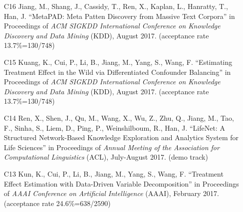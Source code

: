 \documentclass[10pt]{article}
\newenvironment{myindentpar}[1]%
{\begin{list}{}%
         {\setlength{\leftmargin}{#1}}%
         \item[]%
}
{\end{list}}
\newcounter{list}
\begin{document}
\begin{myindentpar}{0.00cm}
\begin{enumerate}[leftmargin=.5cm]
\item[C16] Jiang, M., Shang, J., Cassidy, T., Ren, X., Kaplan, L., Hanratty, T., Han, J. ``MetaPAD: Meta Patten Discovery from Massive Text Corpora'' in Proceedings of \emph{ACM SIGKDD International Conference on Knowledge Discovery and Data Mining} (KDD), August 2017. (acceptance rate 13.7\%=130/748)

\vspace{-0.1cm}

\item[C15] Kuang, K., Cui, P., Li, B., Jiang, M., Yang, S., Wang, F. ``Estimating Treatment Effect in the Wild via Differentiated Confounder Balancing'' in Proceedings of \emph{ACM SIGKDD International Conference on Knowledge Discovery and Data Mining} (KDD), August 2017. (acceptance rate 13.7\%=130/748)

\vspace{-0.1cm}

\item[C14] Ren, X., Shen, J., Qu, M., Wang, X., Wu, Z., Zhu, Q., Jiang, M., Tao, F., Sinha, S., Liem, D., Ping, P., Weinshilboum, R., Han, J. ``LifeNet: A Structured Network-Based Knowledge Exploration and Analytics System for Life Sciences'' in Proceedings of \emph{Annual Meeting of the Association for Computational Linguistics} (ACL), July-August 2017. (demo track)

\vspace{-0.1cm}

\item[C13] Kun, K., Cui, P., Li, B., Jiang, M., Yang, S., Wang, F. ``Treatment Effect Estimation with Data-Driven Variable Decomposition'' in Proceedings of \emph{AAAI Conference on Artificial Intelligence} (AAAI), February 2017. (acceptance rate 24.6\%=638/2590)

\vspace{-0.1cm}


\end{enumerate}
\end{myindentpar}
\end{document}
